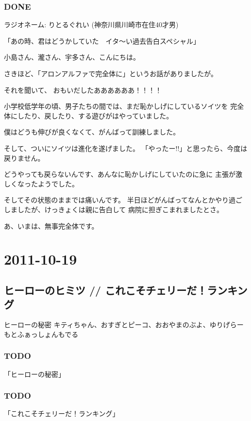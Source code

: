 \documentclass[11pt]{article}
\begin{document}
\subsubsection{\textbf{DONE}}
\label{sec-53_2_1}

ラジオネーム: りとるぐれい (神奈川県川崎市在住40才男)

「あの時、君はどうかしていた　イタ～い過去告白スペシャル」

小島さん、瀧さん、宇多さん、こんにちは。

さきほど、「アロンアルファで完全体に」というお話がありましたが。

それを聞いて、
おもいだしたああああああ！！！！

小学校低学年の頃、男子たちの間では、まだ恥かしげにしているソイツを
完全体にしたり、戻したり、する遊びがはやっていました。

僕はどうも伸びが良くなくて、がんばって訓練しました。

そして、ついにソイツは進化を遂げました。
「やったー!!」と思ったら、今度は戻りません。

どうやっても戻らないんです、あんなに恥かしげにしていたのに急に
主張が激しくなったようでした。

そしてその状態のままでは痛いんです。
半日ほどがんばってなんとかやり過ごしましたが、けっきょくは親に告白して
病院に担ぎこまれましたとさ。

あ、いまは、無事完全体です。
\section{2011-10-19}
\label{sec-54}
\subsection{ヒーローのヒミツ // これこそチェリーだ！ランキング}
\label{sec-54_1}

ヒーローの秘密
キティちゃん、おすぎとピーコ、おおやまのぶよ、ゆりげらー もとふぁっしょんもでる
\subsubsection{\textbf{TODO}}
\label{sec-54_1_1}

「ヒーローの秘密」
\subsubsection{\textbf{TODO}}
\label{sec-54_1_2}

「これこそチェリーだ！ランキング」
\end{document}
